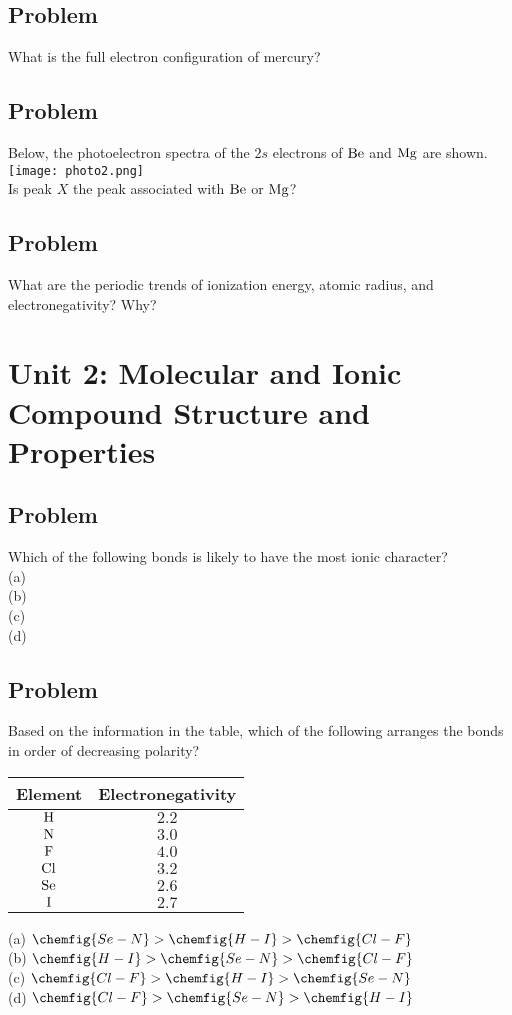 \documentclass[../main.tex]{subfiles}
\begin{document}
\subsection*{Problem \countThis}
What is the full electron configuration of mercury?
\subsection*{Problem \countThis}
Below, the photoelectron spectra of the \(2s\) electrons of \(\ce{Be}\) and \(\ce{Mg}\) are shown.
\texttt{[image: photo2.png]} \\
Is peak \(X\) the peak associated with \(\ce{Be}\) or \(\ce{Mg}\)?
\subsection*{Problem \countThis}
What are the periodic trends of ionization energy, atomic radius, and electronegativity? Why?
\section{Unit 2: Molecular and Ionic Compound Structure and Properties}
\subsection*{Problem \countThis}
Which of the following bonds is likely to have the most ionic character? \\
(a)  \\
(b)  \\
(c) \\
(d) 
\subsection*{Problem \countThis}
Based on the information in the table, which of the following arranges the bonds in order of decreasing polarity? \\
\begin{center}
\begin{tabular}{|cc|}
    \hline 
    Element & Electronegativity \\ [0.5 ex]
    \hline \hline
    \(\ce{H}\) & \(2.2\)\\
    \(\ce{N}\) & \(3.0\) \\
    \(\ce{F}\) & \(4.0\) \\
    \(\ce{Cl}\) & \(3.2\) \\
    \(\ce{Se}\) & \(2.6\) \\
    \(\ce{I}\) & \(2.7\)\\ [1ex]
    \hline
\end{tabular}
\end{center} 
(a) \(\chemfig{Se-N} > \chemfig{H-I} > \chemfig{Cl-F}\) \\
(b) \(\chemfig{H-I} > \chemfig{Se-N} >\chemfig{Cl-F}\)\\
(c) \(\chemfig{Cl-F} > \chemfig{H-I} > \chemfig{Se-N}\)\\
(d) \(\chemfig{Cl-F} > \chemfig{Se-N} > \chemfig{H-I}\)
\end{document}
